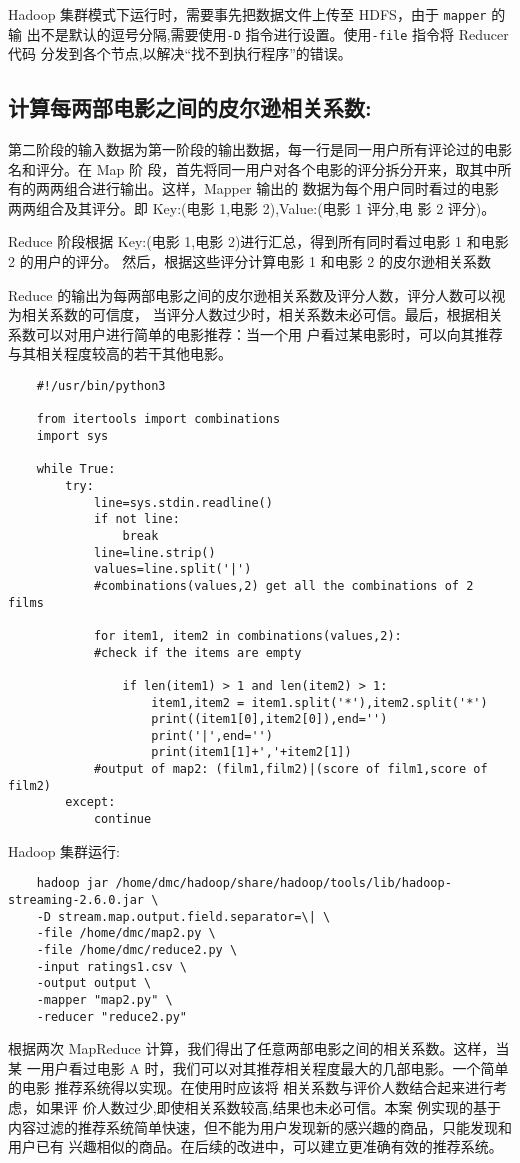 Hadoop 集群模式下运行时，需要事先把数据文件上传至 HDFS，由于 \lstinline|mapper| 的 输
出不是默认的逗号分隔,需要使用\lstinline|-D| 指令进行设置。使用\lstinline|-file| 指令将 Reducer
代码 分发到各个节点,以解决``找不到执行程序''的错误。

\subsection{计算每两部电影之间的皮尔逊相关系数:}\label{ux8ba1ux7b97ux6bcfux4e24ux90e8ux7535ux5f71ux4e4bux95f4ux7684ux76aeux5c14ux900aux76f8ux5173ux7cfbux6570}

第二阶段的输入数据为第一阶段的输出数据，每一行是同一用户所有评论过的电影名和评分。在
Map 阶
段，首先将同一用户对各个电影的评分拆分开来，取其中所有的两两组合进行输出。这样，Mapper
输出的 数据为每个用户同时看过的电影两两组合及其评分。即 Key:(电影 1,电影
2),Value:(电影 1 评分,电 影 2 评分)。

Reduce 阶段根据 Key:(电影 1,电影 2)进行汇总，得到所有同时看过电影 1
和电影 2 的用户的评分。 然后，根据这些评分计算电影 1 和电影 2
的皮尔逊相关系数

Reduce
的输出为每两部电影之间的皮尔逊相关系数及评分人数，评分人数可以视为相关系数的可信度，
当评分人数过少时，相关系数未必可信。最后，根据相关系数可以对用户进行简单的电影推荐：当一个用
户看过某电影时，可以向其推荐与其相关程度较高的若干其他电影。

\begin{lstlisting}
	#!/usr/bin/python3

	from itertools import combinations
	import sys

	while True:
	    try:
	        line=sys.stdin.readline()
	        if not line:
	            break
	        line=line.strip()
	        values=line.split('|')
	        #combinations(values,2) get all the combinations of 2 films

	        for item1, item2 in combinations(values,2):
	        #check if the items are empty

	            if len(item1) > 1 and len(item2) > 1:
	                item1,item2 = item1.split('*'),item2.split('*')
	                print((item1[0],item2[0]),end='')
	                print('|',end='')
	                print(item1[1]+','+item2[1])
            #output of map2: (film1,film2)|(score of film1,score of film2)
	    except:
	        continue
\end{lstlisting}

Hadoop 集群运行:

\begin{lstlisting}
	hadoop jar /home/dmc/hadoop/share/hadoop/tools/lib/hadoop-streaming-2.6.0.jar \
	-D stream.map.output.field.separator=\| \
	-file /home/dmc/map2.py \
	-file /home/dmc/reduce2.py \
	-input ratings1.csv \
	-output output \
	-mapper "map2.py" \
	-reducer "reduce2.py"
\end{lstlisting}

根据两次 MapReduce 计算，我们得出了任意两部电影之间的相关系数。这样，当某
一用户看过电影 A
时，我们可以对其推荐相关程度最大的几部电影。一个简单的电影
推荐系统得以实现。在使用时应该将
相关系数与评价人数结合起来进行考虑，如果评
价人数过少,即使相关系数较高,结果也未必可信。本案
例实现的基于内容过滤的推荐系统简单快速，但不能为用户发现新的感兴趣的商品，只能发现和用户已有
兴趣相似的商品。在后续的改进中，可以建立更准确有效的推荐系统。

